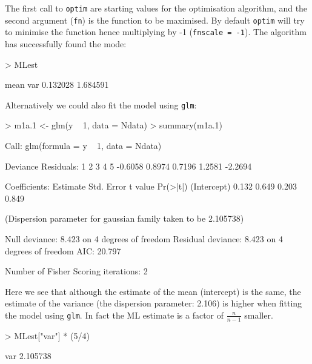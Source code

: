 \documentclass{article}
\begin{document}
\iftalk
\else
\fi

The first call to \texttt{optim} are starting values for the optimisation algorithm, and the second argument (\texttt{fn}) is the function to be maximised. By default \texttt{optim} will try to minimise the function hence multiplying by -1 (\texttt{fnscale = -1}).  The algorithm has successfully found the mode:

\begin{Schunk}
\begin{Sinput}
> MLest
\end{Sinput}
\begin{Soutput}
    mean      var 
0.132028 1.684591 
\end{Soutput}
\end{Schunk}

Alternatively we could also fit the model using \texttt{glm}:

\begin{Schunk}
\begin{Sinput}
> m1a.1 <- glm(y ~ 1, data = Ndata)
> summary(m1a.1)
\end{Sinput}
\begin{Soutput}
Call:
glm(formula = y ~ 1, data = Ndata)

Deviance Residuals: 
      1        2        3        4        5  
-0.6058   0.8974   0.7196   1.2581  -2.2694  

Coefficients:
            Estimate Std. Error t value Pr(>|t|)
(Intercept)    0.132      0.649   0.203    0.849

(Dispersion parameter for gaussian family taken to be 2.105738)

    Null deviance: 8.423  on 4  degrees of freedom
Residual deviance: 8.423  on 4  degrees of freedom
AIC: 20.797

Number of Fisher Scoring iterations: 2
\end{Soutput}
\end{Schunk}
 
Here we see that although the estimate of the mean (intercept) is the same, the estimate of the variance (the dispersion parameter: 2.106) is higher when fitting the model using \texttt{glm}. In fact the ML estimate is a factor of $\frac{n}{n-1}$ smaller.

\begin{Schunk}
\begin{Sinput}
> MLest["var"] * (5/4)
\end{Sinput}
\begin{Soutput}
     var 
2.105738 
\end{Soutput}
\end{Schunk}
\end{document}
